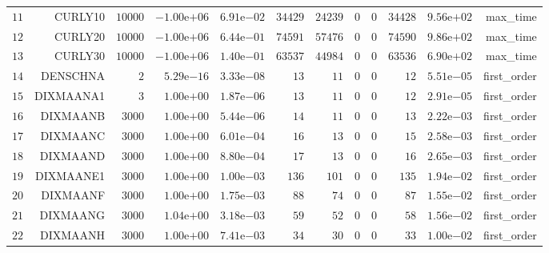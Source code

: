 \begin{longtable}{rrrrrrrrrrrr}
  \(    11\) & CURLY10 & \( 10000\) & \(-1.00\)e\(+06\) & \( 6.91\)e\(-02\) & \( 34429\) & \( 24239\) & \(     0\) & \(     0\) & \( 34428\) & \( 9.56\)e\(+02\) & max\_time \\
  \(    12\) & CURLY20 & \( 10000\) & \(-1.00\)e\(+06\) & \( 6.44\)e\(-01\) & \( 74591\) & \( 57476\) & \(     0\) & \(     0\) & \( 74590\) & \( 9.86\)e\(+02\) & max\_time \\
  \(    13\) & CURLY30 & \( 10000\) & \(-1.00\)e\(+06\) & \( 1.40\)e\(-01\) & \( 63537\) & \( 44984\) & \(     0\) & \(     0\) & \( 63536\) & \( 6.90\)e\(+02\) & max\_time \\
  \(    14\) & DENSCHNA & \(     2\) & \( 5.29\)e\(-16\) & \( 3.33\)e\(-08\) & \(    13\) & \(    11\) & \(     0\) & \(     0\) & \(    12\) & \( 5.51\)e\(-05\) & first\_order \\
  \(    15\) & DIXMAANA1 & \(     3\) & \( 1.00\)e\(+00\) & \( 1.87\)e\(-06\) & \(    13\) & \(    11\) & \(     0\) & \(     0\) & \(    12\) & \( 2.91\)e\(-05\) & first\_order \\
  \(    16\) & DIXMAANB & \(  3000\) & \( 1.00\)e\(+00\) & \( 5.44\)e\(-06\) & \(    14\) & \(    11\) & \(     0\) & \(     0\) & \(    13\) & \( 2.22\)e\(-03\) & first\_order \\
  \(    17\) & DIXMAANC & \(  3000\) & \( 1.00\)e\(+00\) & \( 6.01\)e\(-04\) & \(    16\) & \(    13\) & \(     0\) & \(     0\) & \(    15\) & \( 2.58\)e\(-03\) & first\_order \\
  \(    18\) & DIXMAAND & \(  3000\) & \( 1.00\)e\(+00\) & \( 8.80\)e\(-04\) & \(    17\) & \(    13\) & \(     0\) & \(     0\) & \(    16\) & \( 2.65\)e\(-03\) & first\_order \\
  \(    19\) & DIXMAANE1 & \(  3000\) & \( 1.00\)e\(+00\) & \( 1.00\)e\(-03\) & \(   136\) & \(   101\) & \(     0\) & \(     0\) & \(   135\) & \( 1.94\)e\(-02\) & first\_order \\
  \(    20\) & DIXMAANF & \(  3000\) & \( 1.00\)e\(+00\) & \( 1.75\)e\(-03\) & \(    88\) & \(    74\) & \(     0\) & \(     0\) & \(    87\) & \( 1.55\)e\(-02\) & first\_order \\
  \(    21\) & DIXMAANG & \(  3000\) & \( 1.04\)e\(+00\) & \( 3.18\)e\(-03\) & \(    59\) & \(    52\) & \(     0\) & \(     0\) & \(    58\) & \( 1.56\)e\(-02\) & first\_order \\
  \(    22\) & DIXMAANH & \(  3000\) & \( 1.00\)e\(+00\) & \( 7.41\)e\(-03\) & \(    34\) & \(    30\) & \(     0\) & \(     0\) & \(    33\) & \( 1.00\)e\(-02\) & first\_order \\

\end{longtable}

